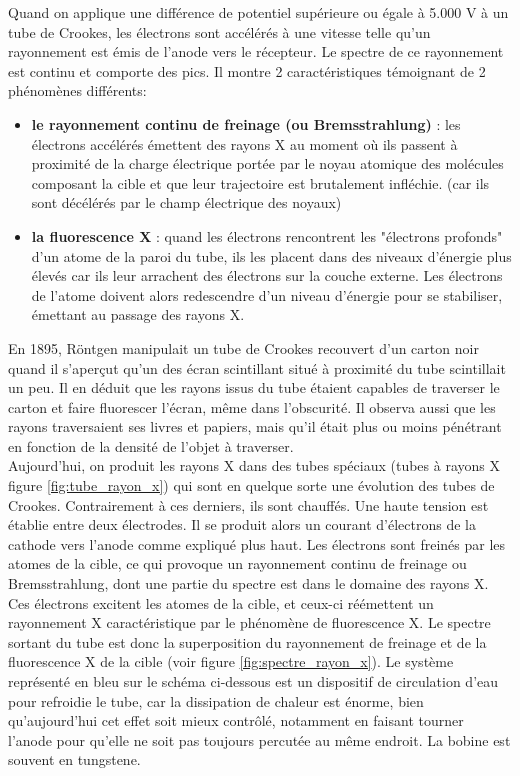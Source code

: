 Quand on applique une différence de potentiel supérieure ou égale à 5.000 V à un tube de Crookes, les électrons sont accélérés à une vitesse telle qu'un rayonnement est émis de l'anode vers le récepteur. Le spectre de ce rayonnement est continu et comporte des pics. Il montre 2 caractéristiques témoignant de 2 phénomènes différents:

\begin{itemize}
    \item \textbf{le rayonnement continu de freinage (ou Bremsstrahlung)} : les électrons accélérés émettent des rayons X au moment où ils passent à proximité de la charge électrique portée par le noyau atomique des molécules composant la cible et que leur trajectoire est brutalement infléchie. (car ils sont décélérés par le champ électrique des noyaux)
    \item \textbf{la fluorescence X} : quand les électrons rencontrent les "électrons profonds" d'un atome de la paroi du tube, ils les placent dans des niveaux d'énergie plus élevés car ils leur arrachent des électrons sur la couche externe. Les électrons de l'atome doivent alors redescendre d'un niveau d'énergie pour se stabiliser, émettant au passage des rayons X. 
\end{itemize}

En 1895, Röntgen manipulait un tube de Crookes recouvert d'un carton noir quand il s'aperçut qu'un des écran scintillant situé à proximité du tube scintillait un peu. Il en déduit que les rayons issus du tube étaient capables de traverser le carton et faire fluorescer l'écran, même dans l'obscurité. Il observa aussi que les rayons traversaient ses livres et papiers, mais qu'il était plus ou moins pénétrant en fonction de la densité de l'objet à traverser. \\

Aujourd'hui, on produit les rayons X dans des tubes spéciaux (tubes à rayons X figure \ref{fig:tube_rayon_x}) qui sont en quelque sorte une évolution des tubes de Crookes. Contrairement à ces derniers, ils sont chauffés. Une haute tension est établie entre deux électrodes. Il se produit alors un courant d'électrons de la cathode vers l'anode comme expliqué plus haut. Les électrons sont freinés par les atomes de la cible, ce qui provoque un rayonnement continu de freinage ou Bremsstrahlung, dont une partie du spectre est dans le domaine des rayons X. Ces électrons excitent les atomes de la cible, et ceux-ci réémettent un rayonnement X caractéristique par le phénomène de fluorescence X. Le spectre sortant du tube est donc la superposition du rayonnement de freinage et de la fluorescence X de la cible (voir figure \ref{fig:spectre_rayon_x}). Le système représenté en bleu sur le schéma ci-dessous est un dispositif de circulation d'eau pour refroidie le tube, car la dissipation de chaleur est énorme, bien qu'aujourd'hui cet effet soit mieux contrôlé, notamment en faisant tourner l'anode pour qu'elle ne soit pas toujours percutée au même endroit. La bobine est souvent en tungstene.  

